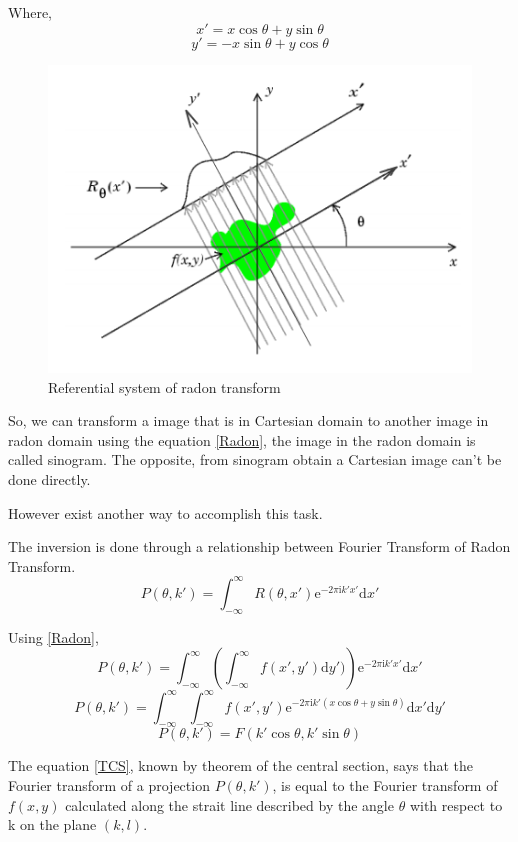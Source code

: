 Where,
\[ x' =  x\cos\theta+y\sin\theta \]
\[y' =  -x\sin\theta+y\cos\theta \]

\begin{figure}[h]
\centering
\includegraphics[scale=0.8]{img/radon_ref}
\caption{{Referential system of radon transform}}\label{radon_ref}
\end{figure}

So, we can transform a image that is in Cartesian domain to another image in radon domain using the equation \eqref{Radon}, the image in the radon domain is called sinogram. The opposite, from sinogram obtain a Cartesian image can't be done directly.

However exist another way to accomplish this task.

The inversion is done through a relationship between Fourier Transform of Radon Transform.
\[ P(\theta,k') = \int_{-\infty}^\infty { R(\theta,x')\mathrm{e}^{-2\pi\mathrm{i}k'x'} \mathrm{d}x'} \]

Using \eqref{Radon},
\[ P(\theta,k')	= \int_{-\infty}^\infty {\left({\int_{-\infty}^\infty {f(x',y')\mathrm{d}y')}}\right)\mathrm{e}^{-2\pi\mathrm{i}k'x'} \mathrm{d}x'} \]
\[ P(\theta,k') = \int_{-\infty}^\infty {\int_{-\infty}^\infty {f(x',y')\mathrm{e}^{-2\pi\mathrm{i}k'(x\cos\theta+y\sin\theta)} \mathrm{d}x'}\mathrm{d}y'} \]	
\begin{equation}\label{TCS}
P(\theta,k') = F(k'\cos\theta,k'\sin\theta)
\end{equation}

The equation \eqref{TCS}, known by theorem of the central section, says that the Fourier transform of a projection $P(\theta,k')$, is equal to the Fourier transform of $f(x,y)$ calculated along the strait line described by the angle $\theta$ with respect to k on the plane $(k,l)$.

